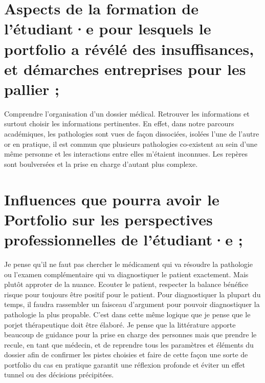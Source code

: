 \section{Aspects de la formation de l’étudiant·e pour lesquels le portfolio a révélé des insuffisances, et démarches entreprises pour les pallier ;}
Comprendre l'organisation d'un dossier médical. Retrouver les informations et surtout choisir les informations pertinentes. En effet, dans notre parcours académiques, les pathologies sont vues de façon dissociées, isolées l'une de l'autre or en pratique, il est commun que plusieurs pathologies co-existent au sein d'une même personne et les interactions entre elles m'étaient inconnues. Les repères sont boulversées et la prise en charge d'autant plus complexe. 

\section{Influences que pourra avoir le Portfolio sur les perspectives professionnelles de l’étudiant·e ;}
Je pense qu'il ne faut pas chercher le médicament qui va résoudre la pathologie ou l'examen complémentaire qui va diagnostiquer le patient exactement. Mais plutôt approter de la nuance. Ecouter le patient, respecter la balance bénéfice risque pour toujours être positif pour le patient. Pour diagnostiquer la plupart du temps, il faudra rassembler un faisceau d'argument pour pouvoir diagnostiquer la pathologie la plus propable. C'est dans cette même logique que je pense que le porjet thérapeutique doit être élaboré. Je pense que la littérature apporte beaucoup de guidance pour la prise en charge des personnes mais que prendre le recule, en tant que médecin, et de reprendre tous les paramètres et éléments du dossier afin de confirmer les pistes choisies et faire de cette façon une sorte de portfolio du cas en pratique garantit une réflexion profonde et éviter un effet tunnel ou des décisions précipitées. 